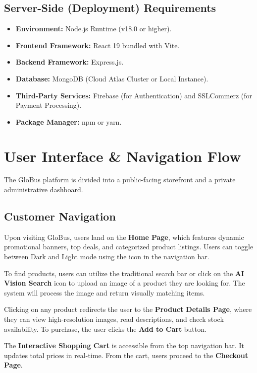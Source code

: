 \subsection{Server-Side (Deployment) Requirements}
\begin{itemize}
    \item \textbf{Environment:} Node.js Runtime (v18.0 or higher).
    \item \textbf{Frontend Framework:} React 19 bundled with Vite.
    \item \textbf{Backend Framework:} Express.js.
    \item \textbf{Database:} MongoDB (Cloud Atlas Cluster or Local Instance).
    \item \textbf{Third-Party Services:} Firebase (for Authentication) and SSLCommerz (for Payment Processing).
    \item \textbf{Package Manager:} npm or yarn.
\end{itemize}

\section{User Interface \& Navigation Flow}
The GloBus platform is divided into a public-facing storefront and a private administrative dashboard.

\subsection{Customer Navigation}
Upon visiting GloBus, users land on the \textbf{Home Page}, which features dynamic promotional banners, top deals, and categorized product listings. Users can toggle between Dark and Light mode using the icon in the navigation bar.

To find products, users can utilize the traditional search bar or click on the \textbf{AI Vision Search} icon to upload an image of a product they are looking for. The system will process the image and return visually matching items. 

Clicking on any product redirects the user to the \textbf{Product Details Page}, where they can view high-resolution images, read descriptions, and check stock availability. To purchase, the user clicks the \textbf{Add to Cart} button.

The \textbf{Interactive Shopping Cart} is accessible from the top navigation bar. It updates total prices in real-time. From the cart, users proceed to the \textbf{Checkout Page}. 

